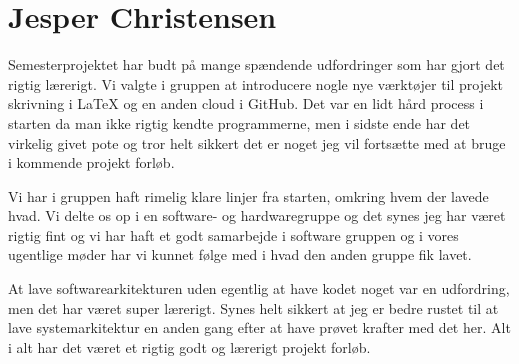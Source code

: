 \section{Jesper Christensen}

Semesterprojektet har budt på mange spændende udfordringer som har gjort det rigtig lærerigt. Vi valgte i gruppen at introducere nogle nye værktøjer til projekt skrivning i LaTeX og en anden cloud i GitHub. Det var en lidt hård process i starten da man ikke rigtig kendte programmerne, men i sidste ende har det virkelig givet pote og tror helt sikkert det er noget jeg vil fortsætte med at bruge i kommende projekt forløb.

Vi har i gruppen haft rimelig klare linjer fra starten, omkring hvem der lavede hvad. Vi delte os op i en software- og hardwaregruppe og det synes jeg har været rigtig fint og vi har haft et godt samarbejde i software gruppen og i vores ugentlige møder har vi kunnet følge med i hvad den anden gruppe fik lavet.

At lave softwarearkitekturen uden egentlig at have kodet noget var en udfordring, men det har været super lærerigt. Synes helt sikkert at jeg er bedre rustet til at lave systemarkitektur en anden gang efter at have prøvet krafter med det her. Alt i alt har det været et rigtig godt og lærerigt projekt forløb.
